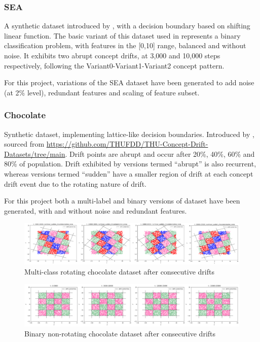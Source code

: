 \documentclass{svproc}
\begin{document}
\subsubsection{SEA}A synthetic dataset introduced by \cite{street2001}, with a decision boundary based on shifting linear function. The basic variant of this dataset used in \cite{pham2025} represents a binary classification problem, with features in the [0,10] range, balanced and without noise. It exhibits two abrupt concept drifts, at 3,000 and 10,000 steps respectively, following the Variant0-Variant1-Variant2 concept pattern. 

For this project, variations of the SEA dataset have been generated to add noise (at 2\% level), redundant features and scaling of feature subset. 


\subsubsection{Chocolate}Synthetic dataset, implementing lattice-like decision boundaries. Introduced by \cite{hu2024}, sourced from \url{https://github.com/THUFDD/THU-Concept-Drift-Datasets/tree/main}. Drift points are abrupt and occur after 20\%, 40\%, 60\% and 80\% of population. Drift exhibited by versions termed “abrupt” is also recurrent, whereas versions termed “sudden” have a smaller region of drift at each concept drift event due to the rotating nature of drift.  

For this project both a multi-label and binary versions of dataset have been generated, with and without noise and redundant features.

\begin{figure}
	\centering
	\includegraphics[scale=.6]{figures/Fig7_chocolate_multi.png}
	\caption{Multi-class rotating chocolate dataset after consecutive drifts}
	\label{fig:fig7}
\end{figure}


\vspace{-15pt}
\begin{figure}
	\centering
	\includegraphics[scale=.6]{figures/Fig8_chocolate_binary.png}
	\caption{Binary non-rotating chocolate dataset after consecutive drifts}
	\label{fig:fig8}
\end{figure}
\vspace{-15pt}
\end{document}
